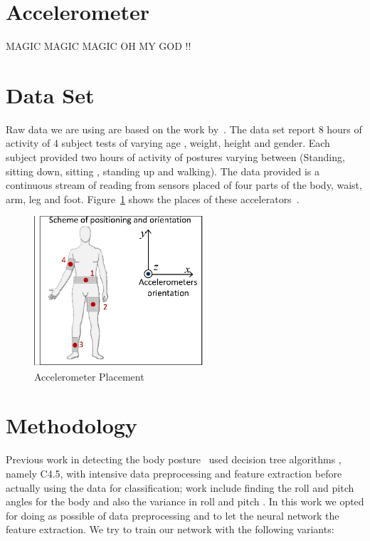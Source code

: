 \documentclass{article}
\begin{document}
\section{Accelerometer}
\label{accelerometer} 

MAGIC MAGIC MAGIC OH MY GOD !!

\section{Data Set}
\label{DataSet}

Raw data we are using are based on the work by~\cite{ugulino2012wearable}. The data set report 8 hours of activity of 4 subject tests 
of varying age , weight, height and gender. Each subject provided two hours of activity of postures varying between (Standing,
sitting down, sitting , standing up and walking). The data provided is a continuous stream of reading from sensors placed of four 
parts of the body, waist, arm, leg and foot. Figure~\ref{acc_placement} shows the places of these accelerators~\cite{ugulino2012wearable}. 


\begin{figure}[h]
\centering
\includegraphics[width=2.5in]{acc_placement}
\caption{Accelerometer Placement}
\label{acc_placement}
\end{figure}
 

\section{Methodology}
\label{meth}

Previous work in detecting the body posture~\cite{ugulino2012wearable} used decision tree algorithms , namely C4.5,  with intensive 
data preprocessing and feature extraction before actually using the data for classification; work include finding the roll and 
pitch angles for the body and also the variance in roll and pitch . In this work we opted for doing as possible of data preprocessing
and to let the neural network the feature extraction. We try to train our network with the following variants:
\end{document}
